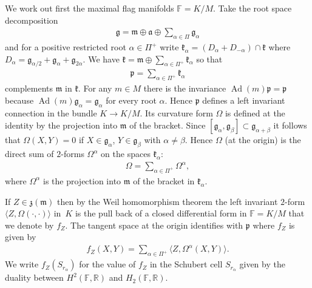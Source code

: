 \documentclass[pdftex]{sigma}
\numberwithin{equation}{section}
\begin{document}
We work out first the maximal flag manifolds $\mathbb{F}=K/M$. Take the root space decomposition
\begin{gather*}
\mathfrak{g}=\mathfrak{m}\oplus \mathfrak{a}\oplus \sum_{\alpha \in \Pi }\mathfrak{g}_{\alpha }
\end{gather*}
and for a positive restricted root $\alpha \in \Pi ^{+}$ write $\mathfrak{k}_{\alpha }= ( D_{\alpha }+D_{-\alpha } ) \cap \mathfrak{k}$ where $D_{\alpha }=\mathfrak{g}_{\alpha /2}+\mathfrak{g}_{\alpha }+\mathfrak{g}_{2\alpha }$. We have $\mathfrak{k}=\mathfrak{m}\oplus \sum\limits_{\alpha \in \Pi ^{+}}\mathfrak{k}_{\alpha }$ so that
\begin{gather*}
\mathfrak{p}=\sum_{\alpha \in \Pi ^{+}}\mathfrak{k}_{\alpha }
\end{gather*}
complements $\mathfrak{m}$ in $\mathfrak{k}$. For any $m\in M$ there is the invariance $\operatorname{Ad}(m) \mathfrak{p}=\mathfrak{p}$ because $\operatorname{Ad}(m) \mathfrak{g}_{\alpha }=\mathfrak{g}_{\alpha }$ for every root $\alpha $. Hence $\mathfrak{p}$ defines a left invariant connection in the bundle $K\rightarrow K/M$. Its curvature form $\Omega $ is defined at the identity by the projection into $\mathfrak{m}$ of the bracket. Since $[\mathfrak{g}_{\alpha },\mathfrak{g}_{\beta }]\subset \mathfrak{g}_{\alpha +\beta }$ it follows that $\Omega ( X,Y) =0$ if $X\in \mathfrak{g}_{\alpha }$, $Y\in \mathfrak{g}_{\beta }$ with $\alpha \neq \beta $. Hence $\Omega $ (at the origin) is the direct sum of $2$-forms $\Omega ^{\alpha }$ on the spaces $\mathfrak{k}_{\alpha }$:
\begin{gather*}
\Omega =\sum_{\alpha \in \Pi ^{+}}\Omega ^{\alpha },
\end{gather*}%
where $\Omega ^{\alpha }$ is the projection into $\mathfrak{m}$ of the bracket in $\mathfrak{k}_{\alpha }$.

If $Z\in \mathfrak{z}(\mathfrak{m}) $ then by the Weil homomorphism theorem the left invariant $2$-form $\langle Z,\Omega (\cdot,\cdot ) \rangle $ in~$K$ is the pull back of a closed differential form in $\mathbb{F}=K/M$ that we denote by $f_{Z}$. The tangent space at the origin identifies with $\mathfrak{p}$ where $f_{Z}$ is given by
\begin{gather*}
f_{Z}(X,Y) =\sum_{\alpha \in \Pi ^{+}}\langle Z,\Omega ^{\alpha}(X,Y) \rangle.
\end{gather*}%
We write $f_{Z} ( S_{r_{\alpha }} ) $ for the value of $f_{Z}$ in the Schubert cell $S_{r_{\alpha }}$ given by the duality between $H^{2}( \mathbb{F},\mathbb{R}) $ and $H_{2}( \mathbb{F},\mathbb{R}) $.
\end{document}
